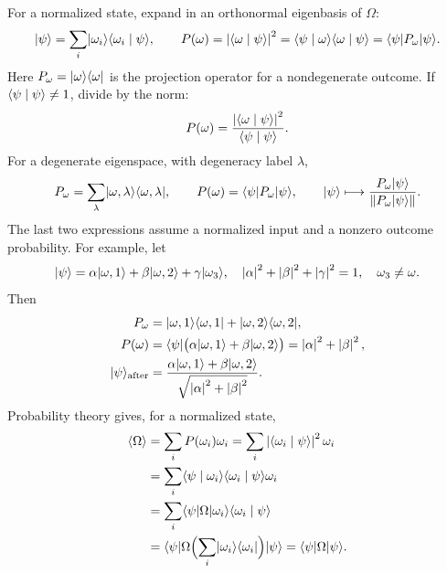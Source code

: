For a normalized state, expand in an orthonormal eigenbasis of $\Omega$:
\[
 \lvert \psi\rangle=\sum_i\lvert \omega_i\rangle\langle \omega_i\mid \psi\rangle,\qquad
 P(\omega)=\left\lvert\langle \omega\mid \psi\rangle\right\rvert^2
 =\langle \psi\mid \omega\rangle\langle \omega\mid \psi\rangle
 =\langle \psi\rvert P_\omega\lvert \psi\rangle.
\]
Here $P_\omega=\lvert \omega\rangle\langle \omega\rvert$ is the projection operator for a
nondegenerate outcome. If $\langle \psi\mid \psi\rangle\ne1$, divide by the norm:
\[
 P(\omega)=\frac{\left\lvert\langle \omega\mid \psi\rangle\right\rvert^2}{\langle \psi\mid \psi\rangle}.
\]
For a degenerate eigenspace, with degeneracy label $\lambda$,
\[
 P_\omega=\sum_\lambda\lvert \omega,\lambda\rangle\langle \omega,\lambda\rvert,\qquad
 P(\omega)=\langle \psi\rvert P_\omega\lvert \psi\rangle,\qquad
 \lvert \psi\rangle\longmapsto\frac{P_\omega\lvert \psi\rangle}{\left\lVert P_\omega\lvert \psi\rangle\right\rVert}.
\]
The last two expressions assume a normalized input and a nonzero outcome
probability. For example, let
\[
 \lvert \psi\rangle=\alpha\lvert \omega,1\rangle+\beta\lvert \omega,2\rangle+\gamma\lvert \omega_3\rangle,
 \quad \left\lvert\alpha\right\rvert^2+\left\lvert\beta\right\rvert^2+\left\lvert\gamma\right\rvert^2=1,
 \quad \omega_3\ne\omega.
\]
Then
\begin{align*}
 P_\omega&=\lvert \omega,1\rangle\langle \omega,1\rvert+\lvert \omega,2\rangle\langle \omega,2\rvert,\\
 P(\omega)&=\langle \psi\rvert\bigl(\alpha\lvert \omega,1\rangle+\beta\lvert \omega,2\rangle\bigr)
          =\left\lvert\alpha\right\rvert^2+\left\lvert\beta\right\rvert^2,\\
 \lvert \psi\rangle_{\mathrm{after}}
 &=\frac{\alpha\lvert \omega,1\rangle+\beta\lvert \omega,2\rangle}
         {\sqrt{\left\lvert\alpha\right\rvert^2+\left\lvert\beta\right\rvert^2}}.
\end{align*}
Probability theory gives, for a normalized state,
\begin{align*}
 \langle\Omega\rangle
 &=\sum_iP(\omega_i)\omega_i
 =\sum_i\left\lvert\langle \omega_i\mid \psi\rangle\right\rvert^2\omega_i\\
 &=\sum_i\langle \psi\mid \omega_i\rangle\langle \omega_i\mid \psi\rangle\omega_i\\
 &=\sum_i\langle \psi\rvert \Omega\lvert \omega_i\rangle\langle \omega_i\mid \psi\rangle\\
 &=\langle \psi\rvert\Omega\Bigl(\sum_i\lvert \omega_i\rangle\langle \omega_i\rvert\Bigr)\lvert \psi\rangle
 =\langle \psi\rvert \Omega\lvert \psi\rangle.
\end{align*}
